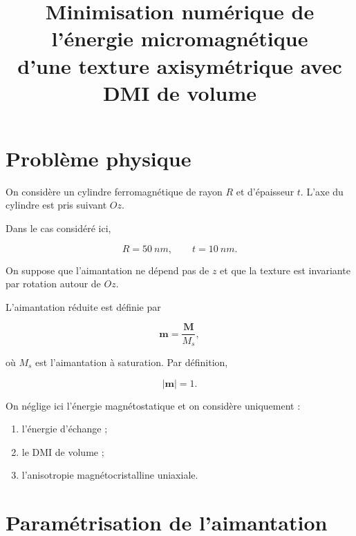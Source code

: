\documentclass[a4paper,11pt]{article}
\title{
Minimisation numérique de l'énergie micromagnétique\\
d'une texture axisymétrique avec DMI de volume
}
\author{}
\date{}
\newcommand{\m}{\bm{m}}
\begin{document}
\maketitle

\tableofcontents

\newpage

\section{Problème physique}

On considère un cylindre ferromagnétique de rayon $R$ et d'épaisseur $t$.
L'axe du cylindre est pris suivant $Oz$.

Dans le cas considéré ici,

\begin{equation}
R = \SI{50}{nm},
\qquad
t = \SI{10}{nm}.
\end{equation}

On suppose que l'aimantation ne dépend pas de $z$ et que la texture est
invariante par rotation autour de $Oz$.

L'aimantation réduite est définie par

\begin{equation}
\m = \frac{\bm M}{M_s},
\end{equation}

où $M_s$ est l'aimantation à saturation. Par définition,

\begin{equation}
\boxed{|\m|=1.}
\end{equation}

On néglige ici l'énergie magnétostatique et on considère uniquement :

\begin{enumerate}
    \item l'énergie d'échange ;
    \item le DMI de volume ;
    \item l'anisotropie magnétocristalline uniaxiale.
\end{enumerate}

\section{Paramétrisation de l'aimantation}
\end{document}
